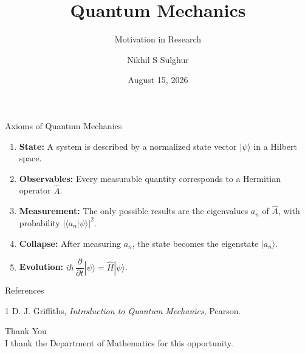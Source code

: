 \documentclass{beamer}
\title{Quantum Mechanics}
\subtitle{Motivation in Research}
\author{Nikhil S Sulghur}
\institute{Mumbai University}
\date{August 15, 2026}
\begin{document}
	
	\begin{frame}\titlepage\end{frame}
	
	\begin{frame}{Axioms of Quantum Mechanics}
		\begin{enumerate}
			\item \textbf{State:} A system is described by a normalized state vector $|\psi\rangle$ in a Hilbert space.
			\item \textbf{Observables:} Every measurable quantity corresponds to a Hermitian operator $\hat A$.
			\item \textbf{Measurement:} The only possible results are the eigenvalues $a_n$ of $\hat A$, with probability $|\langle a_n|\psi\rangle|^2$.
			\item \textbf{Collapse:} After measuring $a_n$, the state becomes the eigenstate $|a_n\rangle$.
			\item \textbf{Evolution:} $i\hbar\,\dfrac{\partial}{\partial t}|\psi\rangle=\hat H|\psi\rangle$.
		\end{enumerate}
	\end{frame}
	
	\begin{frame}{References}
		\begin{thebibliography}{1}
			 D. J. Griffiths, \emph{Introduction to Quantum Mechanics}, Pearson.
		\end{thebibliography}
	\end{frame}
	
	\begin{frame}
		\centering
		{\Huge Thank You}\\[5mm]
		I thank the Department of Mathematics for this opportunity.
	\end{frame}
	
\end{document}
